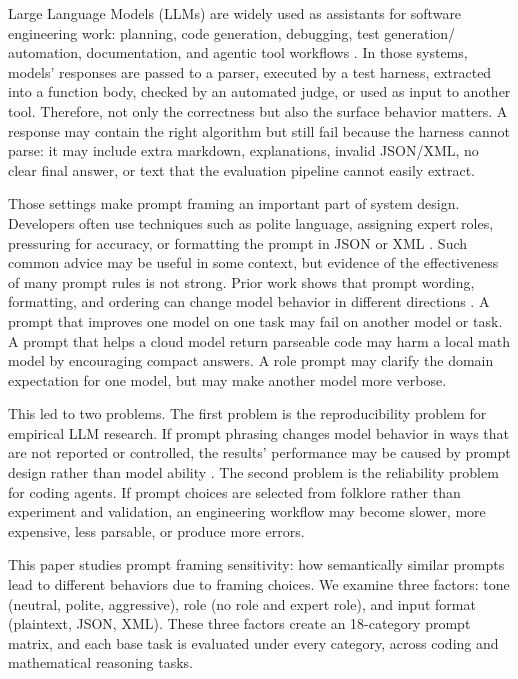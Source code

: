 \documentclass{llncs}
\begin{document}
    Large Language Models (LLMs) are widely used as assistants for software engineering work: planning, code generation, debugging, test generation/ automation, documentation, and agentic tool workflows \citep{brown2020fewshot, ouyang2022instructgpt, chen2021codex, jimenez2023swebench}. In those systems, models' responses are passed to a parser, executed by a test harness, extracted into a function body, checked by an automated judge, or used as input to another tool. Therefore, not only the correctness but also the surface behavior matters. A response may contain the right algorithm but still fail because the harness cannot parse: it may include extra markdown, explanations, invalid JSON/XML, no clear final answer, or text that the evaluation pipeline cannot easily extract.

    Those settings make prompt framing an important part of system design. Developers often use techniques such as polite language, assigning expert roles, pressuring for accuracy, or formatting the prompt in JSON or XML \citep{li2023emotionprompt,yin2024politeness,liu2024structuredoutput}. Such common advice may be useful in some context, but evidence of the effectiveness of many prompt rules is not strong. Prior work shows that prompt wording, formatting, and ordering can change model behavior in different directions \citep{zhao2021calibrate, lu2021fantastically, sclar2023spurious, zhuo2024prosa}. A prompt that improves one model on one task may fail on another model or task. A prompt that helps a cloud model return parseable code may harm a local math model by encouraging compact answers. A role prompt may clarify the domain expectation for one model, but may make another model more verbose.

    This led to two problems. The first problem is the reproducibility problem for empirical LLM research. If prompt phrasing changes model behavior in ways that are not reported or controlled, the results' performance may be caused by prompt design rather than model ability \citep{hua2025promptartifact}. The second problem is the reliability problem for coding agents. If prompt choices are selected from folklore rather than experiment and validation, an engineering workflow may become slower, more expensive, less parsable, or produce more errors.

    This paper studies prompt framing sensitivity: how semantically similar prompts lead to different behaviors due to framing choices. We examine three factors: tone (neutral, polite, aggressive), role (no role and expert role), and input format (plaintext, JSON, XML). These three factors create an 18-category prompt matrix, and each base task is evaluated under every category, across coding and mathematical reasoning tasks.\\
\end{document}
